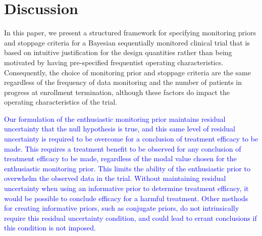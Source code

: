 \documentclass[AMA,STIX1COL,doublespace]{WileyNJD-v2}
\begin{document}
\section{Discussion}\label{sec:discussion}
In this paper, we present a structured framework for specifying monitoring priors and stoppage criteria for a Bayesian sequentially monitored clinical trial that is based on intuitive justification for the design quantities rather than being motivated by having pre-specified frequentist operating characteristics.
%
%
%
%
%
Consequently, the choice of monitoring prior and stoppage criteria are the same regardless of the frequency of data monitoring and the number of patients in progress at enrollment termination, although these factors do impact the operating characteristics of the trial.
%

\textcolor{blue}{Our formulation of the enthusiastic monitoring prior maintains residual uncertainty that the null hypothesis is true, and this same level of residual uncertainty is required to be overcome for a conclusion of treatment efficacy to be made. This requires a treatment benefit to be observed for any conclusion of treatment efficacy to be made, regardless of the modal value chosen for the enthusiastic monitoring prior. This limits the ability of the enthusiastic prior to overwhelm the observed data in the trial. Without maintaining residual uncertainty when using an informative prior to determine treatment efficacy, it would be possible to conclude efficacy for a harmful treatment. Other methods for creating informative priors, such as conjugate priors, do not intrinsically require this residual uncertainty condition, and could lead to errant conclusions if this condition is not imposed.}
\end{document}

